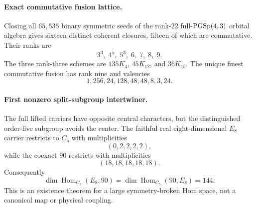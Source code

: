 \paragraph{Exact commutative fusion lattice.}
Closing all $65{,}535$ binary symmetric seeds of the rank-$22$ full-$\mathrm{PGSp}(4,3)$ orbital algebra gives sixteen distinct coherent closures, fifteen of which are commutative.  Their ranks are
\[
3^3,\;4^5,\;5^3,\;6,\;7,\;8,\;9.
\]
The three rank-three schemes are $135K_4$, $45K_{12}$, and $36K_{15}$.  The unique finest commutative fusion has rank nine and valencies
\[
1,256,24,128,48,48,8,3,24.
\]

\paragraph{First nonzero split-subgroup intertwiner.}
The full lifted carriers have opposite central characters, but the distinguished order-five subgroup avoids the center.  The faithful real eight-dimensional $E_8$ carrier restricts to $C_5$ with multiplicities
\[
(0,2,2,2,2),
\]
while the coexact $90$ restricts with multiplicities
\[
(18,18,18,18,18).
\]
Consequently
\[
\dim\operatorname{Hom}_{C_5}(E_8,90)=\dim\operatorname{Hom}_{C_5}(90,E_8)=144.
\]
This is an existence theorem for a large symmetry-broken Hom space, not a canonical map or physical coupling.
